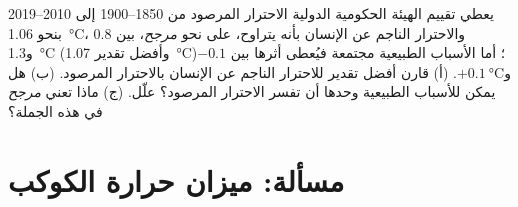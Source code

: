 \begin{exercise}[$\star\star\star$]\label{exo:g9:climate-past-and-present:12}
يعطي تقييم الهيئة الحكومية الدولية الاحترار المرصود من 1850--1900 إلى
2010--2019 بنحو \qty{1.06}{\degreeCelsius}، والاحترار الناجم عن الإنسان بأنه
يتراوح، على نحو \emph{مرجح}، بين 0.8 و\qty{1.3}{\degreeCelsius} (وأفضل تقدير
\qty{1.07}{\degreeCelsius})؛ أما الأسباب الطبيعية مجتمعة فيُعطى أثرها بين
$-0.1$ و$+\qty{0.1}{\degreeCelsius}$. (أ) قارن أفضل تقدير للاحترار الناجم عن
الإنسان بالاحترار المرصود. (ب) هل يمكن للأسباب الطبيعية وحدها أن تفسر الاحترار
المرصود؟ علّل. (ج) ماذا تعني \emph{مرجح} في هذه الجملة؟
\end{exercise}

\section{مسألة: ميزان حرارة الكوكب}

